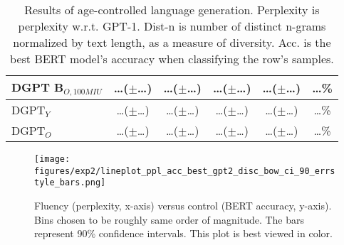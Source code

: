 \begin{table*}[h]
\begin{tabular}{l c c c c c}
    DGPT B$_{O, 100MIU}$ & \dots ($\pm$\dots) & \dots ($\pm$\dots) & \dots ($\pm$\dots) & \dots ($\pm$\dots) & \dots\%\\
    \midrule
    DGPT$_{Y}$ & \dots ($\pm$\dots) & \dots ($\pm$\dots) & \dots ($\pm$\dots) & \dots ($\pm$\dots) & \dots\%\\
    DGPT$_{O}$ & \dots ($\pm$\dots) & \dots ($\pm$\dots) & \dots ($\pm$\dots) & \dots ($\pm$\dots) & \dots\%\\
    \bottomrule
    \end{tabular}
    \caption{ Results of age-controlled language generation. Perplexity is perplexity w.r.t. GPT-1. Dist-n is number of distinct n-grams normalized by text length, as a measure of diversity. Acc. is the best BERT model's accuracy when classifying the row's samples.}
    \label{tab:ctg_results_ws_unprompted}
\end{table*}

\begin{figure}[H]
    \centering
    \texttt{[image: figures/exp2/lineplot\_ppl\_acc\_best\_gpt2\_disc\_bow\_ci\_90\_errstyle\_bars.png]}
    \caption{ Fluency (perplexity, x-axis) versus control (BERT accuracy, y-axis). Bins chosen to be roughly same order of magnitude. The bars represent 90\% confidence intervals. This plot is best viewed in color.}
    \label{fig:ctg_lineplot_fluency_vs_control}
\end{figure}

